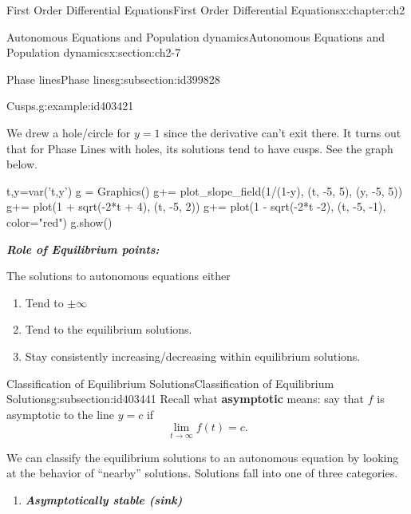 \documentclass[oneside,10pt,]{book}
\newcommand{\alert}[1]{\textbf{\textit{#1}}}
\newcommand{\terminology}[1]{\textbf{#1}}
\numberwithin{equation}{section}
\numberwithin{equation}{section}
\begin{document}
\begin{chapterptx}{First Order Differential Equations}{}{First Order Differential Equations}{}{}{x:chapter:ch2}
\begin{sectionptx}{Autonomous Equations and Population dynamics}{}{Autonomous Equations and Population dynamics}{}{}{x:section:ch2-7}
\begin{subsectionptx}{Phase lines}{}{Phase lines}{}{}{g:subsection:id399828}
\begin{example}{Cusps.}{g:example:id403421}
\begin{image}{0.35}{0.3}{0.35}
\end{image}%
 We drew a hole\slash{}circle for \(y=1\) since the derivative can't exit there. It turns out that for Phase Lines with holes, its solutions tend to have cusps. See the graph below.%
\begin{sageinput}
t,y=var('t,y')
g = Graphics()
g+= plot_slope_field(1/(1-y), (t, -5, 5), (y, -5, 5))
g+= plot(1 + sqrt(-2*t + 4), (t, -5, 2))
g+= plot(1 - sqrt(-2*t -2), (t, -5, -1), color="red")
g.show()
\end{sageinput}
\end{example}
\alert{Role of Equilibrium points:}%
\par
The solutions to autonomous equations either%
\begin{enumerate}
\item{}Tend to \(\pm\infty\)%
\item{}Tend to the equilibrium solutions.%
\item{}Stay consistently increasing\slash{}decreasing within equilibrium solutions.%
\end{enumerate}
%
\end{subsectionptx}
%
%
\typeout{************************************************}
\typeout{************************************************}
%
\begin{subsectionptx}{Classification of Equilibrium Solutions}{}{Classification of Equilibrium Solutions}{}{}{g:subsection:id403441}
Recall what \terminology{asymptotic} means: say that \(f\) is asymptotic to the line \(y = c\) if%
\begin{equation*}
\lim_{t \to \infty} f(t) = c.
\end{equation*}
%
\par
We can classify the equilibrium solutions to an autonomous equation by looking at the behavior of ``nearby'' solutions. Solutions fall into one of three categories.%
%
\begin{enumerate}
\item{}\alert{Asymptotically stable (sink)}%
%
\end{enumerate}
\end{subsectionptx}
\end{sectionptx}
\end{chapterptx}
\end{document}
